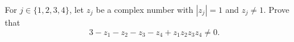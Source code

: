 For $j \in \{1, 2, 3, 4\}$, let $z_j$ be a complex number with $|z_j| = 1$ and $z_j \neq 1$. Prove that
\[
3 - z_1 - z_2 - z_3 - z_4 + z_1 z_2 z_3 z_4 \neq 0.
\]

